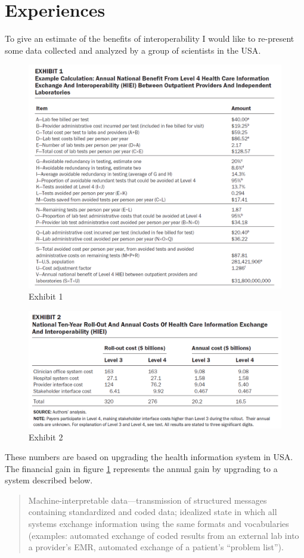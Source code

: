 \section{Experiences}
To give an estimate of the benefits of interoperability I would like to re-present some data collected and analyzed by a group of scientists in the USA\cite{11}.
\begin{figure}
\centering
\includegraphics[width=12cm]{litterature/images/exhibit1}
\caption{Exhibit 1}
\label{fig:exhibit_1}
\end{figure}
\begin{figure}
\centering
\includegraphics[width=12cm]{litterature/images/exhibit2}
\caption{Exhibit 2}
\label{fig:exhibit_2}
\end{figure}
These numbers are based on upgrading the health information system in USA.
The financial gain in figure \ref{fig:exhibit_1} represents the annual gain by upgrading to a system described below.
\begin{quote}
Machine-interpretable data—transmission of structured messages containing standardized and coded data; idealized state in which all systems exchange information using the same formats and vocabularies (examples: automated exchange of coded results from an external lab into a provider’s EMR, automated exchange of a patient’s “problem list”).
\end{quote}
